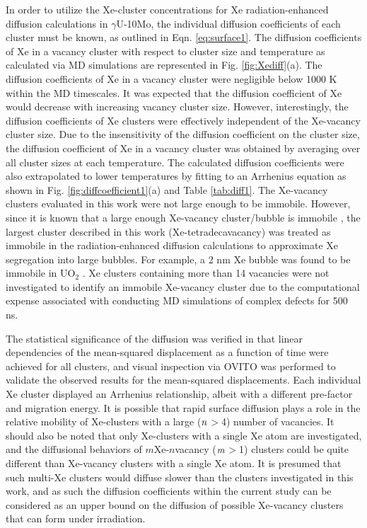 \documentclass[preprint,12pt]{elsarticle}
\begin{document}
\indent In order to utilize the Xe-cluster concentrations for Xe radiation-enhanced diffusion calculations in $\gamma$U-10Mo, the individual diffusion coefficients of each cluster must be known, as outlined in Eqn. \ref{eq:surface1}. The diffusion coefficients of Xe in a vacancy cluster with respect to cluster size and temperature as calculated via MD simulations are represented in Fig. \ref{fig:Xediff}(a). The diffusion coefficients of Xe in a vacancy cluster were negligible below 1000 K within the MD timescales. It was expected that the diffusion coefficient of Xe would decrease with increasing vacancy cluster size. However, interestingly, the diffusion coefficients of Xe clusters were effectively independent of the Xe-vacancy cluster size. Due to the insensitivity of the diffusion coefficient on the cluster size, the diffusion coefficient of Xe in a vacancy cluster was obtained by averaging over all cluster sizes at each temperature. The calculated diffusion coefficients were also extrapolated to lower temperatures by fitting to an Arrhenius equation as shown in Fig. \ref{fig:diffcoefficient1}(a) and Table \ref{tab:diff1}. The Xe-vacancy clusters evaluated in this work were not large enough to be immobile. However, since it is known that a large enough Xe-vacancy cluster/bubble is immobile \cite{baker1977migration, kim2022modeling}, the largest cluster described in this work (Xe-tetradecavacancy) was treated as immobile in the radiation-enhanced diffusion calculations to approximate Xe segregation into large bubbles. For example, a 2 nm Xe bubble was found to be immobile in UO$_{2}$ \cite{baker1977migration}. Xe clusters containing more than 14 vacancies were not investigated to identify an immobile Xe-vacancy cluster due to the computational expense associated with conducting MD simulations of complex defects for 500 ns.

\indent The statistical significance of the diffusion was verified in that linear dependencies of the mean-squared displacement as a function of time were achieved for all clusters, and visual inspection via OVITO \cite{stukowski2009visualization} was performed to validate the observed results for the mean-squared displacements. Each individual Xe cluster displayed an Arrhenius relationship, albeit with a different pre-factor and migration energy. It is possible that rapid surface diffusion plays a role in the relative mobility of Xe-clusters with a large ($\it{n}$$>$4) number of vacancies. It should also be noted that only Xe-clusters with a single Xe atom are investigated, and the diffusional behaviors of $m$Xe-$n$vacancy ($\it{m}$$>$1) clusters could be quite different than Xe-vacancy clusters with a single Xe atom. It is presumed that such multi-Xe clusters would diffuse slower than the clusters investigated in this work, and as such the diffusion coefficients within the current study can be considered as an upper bound on the diffusion of possible Xe-vacancy clusters that can form under irradiation. 
\end{document}
